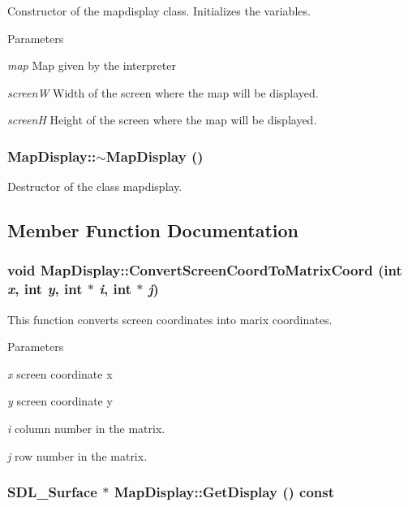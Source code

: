 Constructor of the mapdisplay class. Initializes the variables. 


\begin{DoxyParams}{Parameters}
\item[{\em map}]Map given by the interpreter \item[{\em screenW}]Width of the screen where the map will be displayed. \item[{\em screenH}]Height of the screen where the map will be displayed. \end{DoxyParams}
\hypertarget{classMapDisplay_a95dc44c5a18970df2131eeb10b59cd21}{
\subsubsection[{$\sim$MapDisplay}]{\setlength{\rightskip}{0pt plus 5cm}MapDisplay::$\sim$MapDisplay ()}}
\label{classMapDisplay_a95dc44c5a18970df2131eeb10b59cd21}


Destructor of the class mapdisplay. 



\subsection{Member Function Documentation}
\hypertarget{classMapDisplay_afd0ef9d9c11103bd966d27a12cd84ed7}{
\subsubsection[{ConvertScreenCoordToMatrixCoord}]{\setlength{\rightskip}{0pt plus 5cm}void MapDisplay::ConvertScreenCoordToMatrixCoord (int {\em x}, \/  int {\em y}, \/  int $\ast$ {\em i}, \/  int $\ast$ {\em j})}}
\label{classMapDisplay_afd0ef9d9c11103bd966d27a12cd84ed7}


This function converts screen coordinates into marix coordinates. 


\begin{DoxyParams}{Parameters}
\item[{\em x}]screen coordinate x \item[{\em y}]screen coordinate y \item[{\em i}]column number in the matrix. \item[{\em j}]row number in the matrix. \end{DoxyParams}
\hypertarget{classMapDisplay_a346dbbf98f1ab76cddab55dfb9c07b27}{
\subsubsection[{GetDisplay}]{\setlength{\rightskip}{0pt plus 5cm}SDL\_\-Surface $\ast$ MapDisplay::GetDisplay () const}}
\label{classMapDisplay_a346dbbf98f1ab76cddab55dfb9c07b27}


